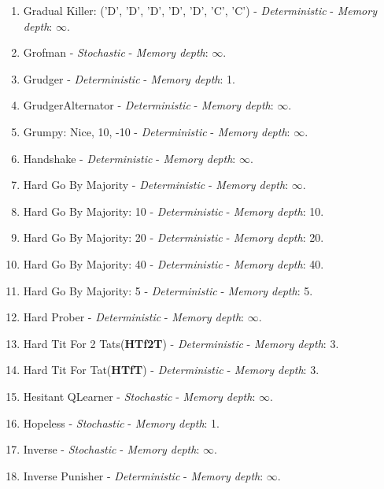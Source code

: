 \documentclass[10pt,letterpaper]{article}
\begin{document}
\begin{enumerate}
\item Gradual Killer: ('D', 'D', 'D', 'D', 'D', 'C', 'C') - \textit{Deterministic} - \textit{Memory depth}: \(\infty\). \cite{Prison1998}
\item Grofman - \textit{Stochastic} - \textit{Memory depth}: \(\infty\). \cite{Axelrod1980a}
\item Grudger - \textit{Deterministic} - \textit{Memory depth}: 1. \cite{Axelrod1980a, Banks1990, Beaufils1997, Berg2015, Li2011}
\item GrudgerAlternator - \textit{Deterministic} - \textit{Memory depth}: \(\infty\). \cite{Prison1998}
\item Grumpy: Nice, 10, -10 - \textit{Deterministic} - \textit{Memory depth}: \(\infty\). \cite{axelrodproject}
\item Handshake - \textit{Deterministic} - \textit{Memory depth}: \(\infty\). \cite{Robson1990}
\item Hard Go By Majority - \textit{Deterministic} - \textit{Memory depth}: \(\infty\). \cite{Mittal2009}
\item Hard Go By Majority: 10 - \textit{Deterministic} - \textit{Memory depth}: 10. \cite{axelrodproject}
\item Hard Go By Majority: 20 - \textit{Deterministic} - \textit{Memory depth}: 20. \cite{axelrodproject}
\item Hard Go By Majority: 40 - \textit{Deterministic} - \textit{Memory depth}: 40. \cite{axelrodproject}
\item Hard Go By Majority: 5 - \textit{Deterministic} - \textit{Memory depth}: 5. \cite{axelrodproject}
\item Hard Prober - \textit{Deterministic} - \textit{Memory depth}: \(\infty\). \cite{Prison1998}
\item Hard Tit For 2 Tats(\textbf{HTf2T}) - \textit{Deterministic} - \textit{Memory depth}: 3. \cite{Stewart2012}
\item Hard Tit For Tat(\textbf{HTfT}) - \textit{Deterministic} - \textit{Memory depth}: 3. \cite{PD2017}
\item Hesitant QLearner - \textit{Stochastic} - \textit{Memory depth}: \(\infty\). \cite{axelrodproject}
\item Hopeless - \textit{Stochastic} - \textit{Memory depth}: 1. \cite{Berg2015}
\item Inverse - \textit{Stochastic} - \textit{Memory depth}: \(\infty\). \cite{axelrodproject}
\item Inverse Punisher - \textit{Deterministic} - \textit{Memory depth}: \(\infty\). \cite{axelrodproject}

\end{enumerate}
\end{document}

